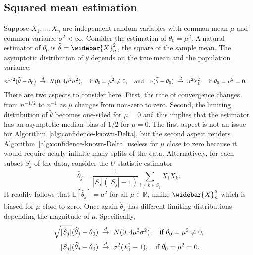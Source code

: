 \documentclass{article}
\numberwithin{myalgctr}{section}
\DeclareRobustCommand{\rchi}{{\mathpalette\irchi\relax}}
\newcommand{\irchi}[2]{\raisebox{\depth}{$#1\chi$}}
\begin{document}
\subsection{Squared mean estimation}\label{subsec:mean-square}
Suppose $X_1, \ldots, X_n$ are independent random variables with common mean $\mu$ and common variance $\sigma^2 < \infty$. Consider the estimation of $\theta_0 = \mu^2$. A natural estimator of $\theta_0$ is $\widetilde{\theta} = \widebar{X}_n^2$, the square of the sample mean. The asymptotic distribution of $\widetilde{\theta}$ depends on the true mean and the population variance:
\begin{equation}\label{eq:mean-square-distribution}
\begin{split}
n^{1/2}(\widetilde{\theta} - \theta_0) ~&\overset{d}{\to}~ N(0,4\mu^2\sigma^2),\quad\mbox{if }\theta_0 = \mu^2 \neq 0,
\quad\mbox{and}\quad n(\widetilde{\theta} - \theta_0) ~\overset{d}{\to}~ \sigma^2\rchi^2_1, \quad\mbox{if }\theta_0 = \mu^2 = 0.
\end{split}
\end{equation}
There are two aspects to consider here. First, the rate of convergence changes from $n^{-1/2}$ to $n^{-1}$ as $\mu$ changes from non-zero to zero. Second, the limiting distribution of $\widetilde{\theta}$ becomes one-sided for $\mu = 0$ and this implies that the estimator has an asymptotic median bias of $1/2$ for $\mu = 0$. The first aspect is not an issue for Algorithm~\ref{alg:confidence-known-Delta}, but the second aspect renders Algorithm~\ref{alg:confidence-known-Delta} useless for $\mu$ close to zero because it would require nearly infinite many splits of the data. Alternatively, for each subset $S_j$ of the data, consider the $U$-statistic estimator
\begin{equation}\label{eq:U-stat-prod}
\widehat{\theta}_j = \frac{1}{|S_j|(|S_j| - 1)}\sum_{i\neq k\in S_j} X_iX_k.
\end{equation}
It readily follows that $\mathbb{E}[\widehat{\theta}_j] = \mu^2$ for all $\mu\in\mathbb{R}$, unlike $\widebar{X}_n^2$ which is biased for $\mu$ close to zero. Once again $\widehat{\theta}_j$ has different limiting distributions depending the magnitude of $\mu$. Specifically,
\begin{equation}\label{eq:mean-square-distribution-U-stat}
\begin{split}
\sqrt{|S_j|}(\widehat{\theta}_j - \theta_0) ~&\overset{d}{\to}~ N(0,4\mu^2\sigma^2),\quad\mbox{if }\theta_0 = \mu^2 \neq 0,\\
|S_j|(\widehat{\theta}_j - \theta_0) ~&\overset{d}{\to}~ \sigma^2(\rchi^2_1 - 1), \quad\mbox{if }\theta_0 = \mu^2 = 0.
\end{split}
\end{equation}
\end{document}
